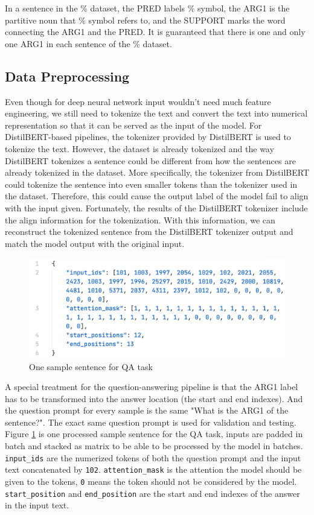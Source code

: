 \documentclass[11pt]{article}
\begin{document}
In a sentence in the \% dataset, the PRED labels \% symbol, the ARG1 is the partitive noun that \% symbol refers to, and the SUPPORT marks the word connecting the ARG1 and the PRED. It is guaranteed that there is one and only one ARG1 in each sentence of the \% dataset.

\subsection{Data Preprocessing}
\label{section:data-preprocessing}

Even though for deep neural network input wouldn't need much feature engineering, we still need to tokenize the text and convert the text into numerical representation so that it can be served as the input of the model. For DistilBERT-based pipelines, the tokenizer provided by DistilBERT is used to tokenize the text. However, the dataset is already tokenized and the way DistilBERT tokenizes a sentence could be different from how the sentences are already tokenized in the dataset. More specifically, the tokenizer from DistilBERT could tokenize the sentence into even smaller tokens than the tokenizer used in the dataset. Therefore, this could cause the output label of the model fail to align with the input given. Fortunately, the results of the DistilBERT tokenizer include the align information for the tokenization. With this information, we can reconstruct the tokenized sentence from the DistilBERT tokenizer output and match the model output with the original input.

\begin{figure}[h]
  \centering
  \includegraphics[width=\linewidth]{assets/dataset-one-qa-sample.png}
  \caption{One sample sentence for QA task}
  \label{fig:dataset-one-qa-sample}
\end{figure}

A special treatment for the question-answering pipeline is that the ARG1 label has to be transformed into the answer location (the start and end indexes). And the question prompt for every sample is the same "What is the ARG1 of the sentence?". The exact same question prompt is used for validation and testing. Figure \ref{fig:dataset-one-qa-sample} is one processed sample sentence for the QA task, inputs are padded in batch and stacked as matrix to be able to be processed by the model in batches. \verb|input_ids| are the numerized tokens of both the question prompt and the input text concatenated by \verb|102|. \verb|attention_mask| is the attention the model should be given to the tokens, \verb|0| means the token should not be considered by the model. \verb|start_position| and \verb|end_position| are the start and end indexes of the answer in the input text.
\end{document}

